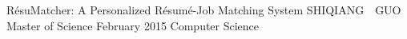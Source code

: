 \maketitlepage
{R\'esuMatcher: A Personalized R\'esum\'e-Job Matching System
}   %
{SHIQIANG~~GUO}%
{Master of Science}                %
{February 2015}%
{Computer Science}         %
